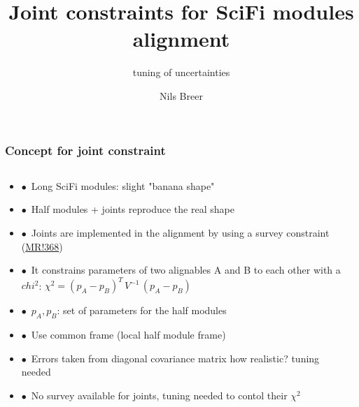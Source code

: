 \documentclass[aspectratio=1610, 12pt]{beamer}
\title{Joint constraints for SciFi modules alignment}
\subtitle{tuning of uncertainties}
\author[N.Breer]{Nils Breer}
\institute{TU Dortmund, AG Albrecht}
\begin{document}
\maketitle

\begin{frame}\frametitle{Concept for joint constraint}
  \begin{columns}
    \begin{column}[c]{0.65\textwidth}
      \begin{itemize}
        \setlength\itemsep{0em}
        \item $\bullet$\, Long SciFi modules: slight "banana shape"
        \item $\bullet$\, Half modules + joints reproduce the real shape
        \item $\bullet$\, Joints are implemented in the alignment by using a survey constraint (\href{https://gitlab.cern.ch/lhcb/Alignment/-/merge_requests/368}{MR!368})
        \item $\bullet$\, It constrains  parameters of two alignables A and B to each other with a $chi^2$: $\chi^2 = (p_A - p_B)^T\,V^{-1}\,(p_A - p_B)$
        \item $\bullet$\, $p_A, p_B$: set of parameters for the half modules
        \item $\bullet$\, Use common frame (local half module frame)
        \item $\bullet$\, Errors taken from diagonal covariance matrix \to how realistic? \to tuning needed
        \item $\bullet$\, No survey available for joints, tuning needed to contol their $\chi^2$
      \end{itemize}
    \end{column}
    \begin{column}[c]{0.35\textwidth}
      
    \end{column}
  \end{columns}
\end{frame}
\end{document}
